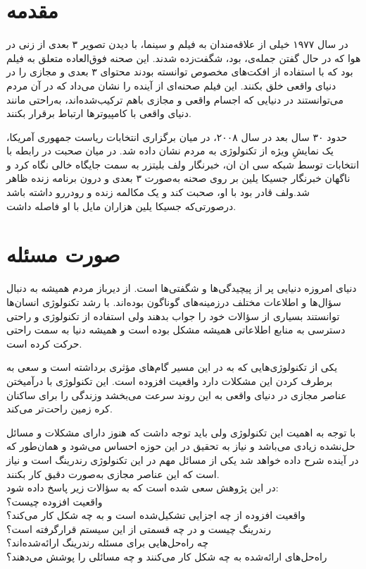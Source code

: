 \section{مقدمه}
در سال ۱۹۷۷ خیلی از علاقه‌مندان به فیلم و سینما، با دیدن تصویر ۳ بعدی از زنی در هوا که در حال گفتن جمله‌ی،   بود، شگفت‌زده شدند. این صحنه فوق‌العاده متعلق به فیلم \lr{جنگ ستارگام]} بود که با استفاده از افکت‌های مخصوص توانسته بودند محتوای ۳ بعدی و مجازی را در دنیای واقعی خلق بکنند. این فیلم صحنه‌ای از آینده را نشان می‌داد که در آن مردم می‌توانستند در دنیایی که اجسام واقعی و مجازی باهم ترکیب‌شده‌اند، به‌راحتی مانند دنیای واقعی با کامپیوترها ارتباط برقرار بکنند.

حدود ۳۰ سال بعد در سال ۲۰۰۸، در میان برگزاری انتخابات ریاست جمهوری آمریکا، یک نمایشِ ویژه از تکنولوژی به مردم نشان داده شد. در میان صحبت در رابطه با انتخابات توسط شبکه سی ان ان، خبرنگار ولف بلیتزر به سمت جایگاه خالی نگاه کرد و ناگهان خبرنگار جسیکا یلین  بر روی صحنه به‌صورت ۳ بعدی و درون برنامه زنده ظاهر شد.ولف قادر بود با او، صحبت کند و یک مکالمه زنده و رودررو داشته باشد درصورتی‌که جسیکا یلین هزاران مایل با او فاصله داشت.
\section{صورت مسئله}
دنیای امروزه دنیایی پر از پیچیدگی‌ها و شگفتی‌ها است. از دیرباز مردم همیشه به دنبال سؤال‌ها و اطلاعات مختلف درزمینه‌های گوناگون بوده‌اند.
با رشد تکنولوژی انسان‌ها توانستند بسیاری از سؤالات خود را جواب بدهند ولی استفاده از تکنولوژی و راحتی دسترسی به منابع اطلاعاتی همیشه مشکل بوده است و همیشه دنیا به سمت راحتی حرکت کرده است.

یکی از تکنولوژی‌هایی که به در این مسیر گام‌های مؤثری برداشته است و سعی به برطرف کردن این مشکلات دارد واقعیت افزوده است. این تکنولوژی با درآمیختن عناصر مجازی در دنیای واقعی به این روند سرعت می‌بخشد وزندگی را برای ساکنان کره زمین راحت‌تر می‌کند.

با توجه به اهمیت این تکنولوژی ولی باید توجه داشت که هنوز دارای مشکلات و مسائل حل‌نشده زیادی می‌باشد و نیاز به تحقیق در این حوزه احساس می‌شود و همان‌طور که در آینده شرح داده خواهد شد یکی از مسائل مهم در این تکنولوژی رندرینگ است و نیاز است که این عناصر مجازی به‌صورت دقیق کار بکنند.
\\
در این پژوهش سعی شده است که به سؤالات زیر پاسخ داده شود:
\\
واقعیت افزوده چیست؟
\\
واقعیت افزوده از چه اجزایی تشکیل‌شده است و به چه شکل کار می‌کند؟
\\
رندرینگ چیست و در چه قسمتی از این سیستم قرارگرفته است؟
\\
چه راه‌حل‌هایی برای مسئله رندرینگ ارائه‌شده‌اند؟
\\
راه‌حل‌های ارائه‌شده به چه شکل کار می‌کنند و چه مسائلی را پوشش می‌دهند؟



